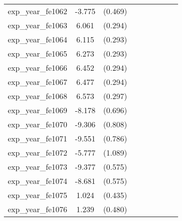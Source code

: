 {\begin{tabular}{l*{4}{cc}}
exp\_year\_fe1062&   -3.775\sym{***}&  (0.469)&                  &         &                  &         &                  &         \\
exp\_year\_fe1063&    6.061\sym{***}&  (0.294)&                  &         &                  &         &                  &         \\
exp\_year\_fe1064&    6.115\sym{***}&  (0.293)&                  &         &                  &         &                  &         \\
exp\_year\_fe1065&    6.273\sym{***}&  (0.293)&                  &         &                  &         &                  &         \\
exp\_year\_fe1066&    6.452\sym{***}&  (0.294)&                  &         &                  &         &                  &         \\
exp\_year\_fe1067&    6.477\sym{***}&  (0.294)&                  &         &                  &         &                  &         \\
exp\_year\_fe1068&    6.573\sym{***}&  (0.297)&                  &         &                  &         &                  &         \\
exp\_year\_fe1069&   -8.178\sym{***}&  (0.696)&                  &         &                  &         &                  &         \\
exp\_year\_fe1070&   -9.306\sym{***}&  (0.808)&                  &         &                  &         &                  &         \\
exp\_year\_fe1071&   -9.551\sym{***}&  (0.786)&                  &         &                  &         &                  &         \\
exp\_year\_fe1072&   -5.777\sym{***}&  (1.089)&                  &         &                  &         &                  &         \\
exp\_year\_fe1073&   -9.377\sym{***}&  (0.575)&                  &         &                  &         &                  &         \\
exp\_year\_fe1074&   -8.681\sym{***}&  (0.575)&                  &         &                  &         &                  &         \\
exp\_year\_fe1075&    1.024\sym{*}  &  (0.435)&                  &         &                  &         &                  &         \\
exp\_year\_fe1076&    1.239\sym{**} &  (0.480)&                  &         &                  &         &                  &         \\

\end{tabular}}
